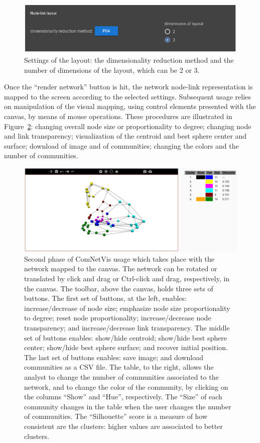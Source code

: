 \documentclass[Afour,sagev,times]{sagej}
\begin{document}
\begin{figure}\centering
 \includegraphics[width=\columnwidth]{figs/lay}
  \caption{
    Settings of the layout: the dimensionality reduction method and
    the number of dimensions of the layout, which can be 2 or 3.
  }\label{flay}
\end{figure}

Once the ``render network'' button is hit,
the network node-link representation is mapped to the screen
according to the selected settings.
Subsequent usage relies on manipulation of the visual mapping, using control elements presented with the canvas, by means of mouse operations.
These procedures are illustrated in Figure~\ref{fsecond}:
changing overall node size or proportionality to degree;
changing node and link transparency;
visualization of the centroid and best sphere center and surface;
download of image and of communities;
changing the colors and the number of communities.

\begin{figure}\centering
 \includegraphics[width=\textwidth]{figs/second}
  \caption{
    Second phase of ComNetVis usage which takes place with the network mapped to the canvas.
    The network can be rotated or translated by click and drag or Ctrl-click and drag, respectively, in the canvas.
    The toolbar, above the canvas, holds three sets of buttons.
    The first set of buttons, at the left, enables:
    increase/decrease of node size;
    emphasize node size proportionality to degree;
    reset node proportionality;
    increase/decrease node transparency; and
    increase/decrease link transparency.
    The middle set of buttons enables:
    show/hide centroid;
    show/hide best sphere center;
    show/hide best sphere surface; and
    recover initial position.
    The last set of buttons enables:
    save image; and
    download communities as a CSV file.
    The table, to the right, allows the analyst to change the number of communities associated to the network, and to change the color of the community, by
    clicking on the columns ``Show'' and ``Hue'', respectively.
    The ``Size'' of each community changes in the table when the user changes the number of communities.
    The ``Silhouette'' score is a measure of how consistent are the clusters:
    higher values are associated to better clusters.
  }\label{fsecond}
\end{figure}
\end{document}
